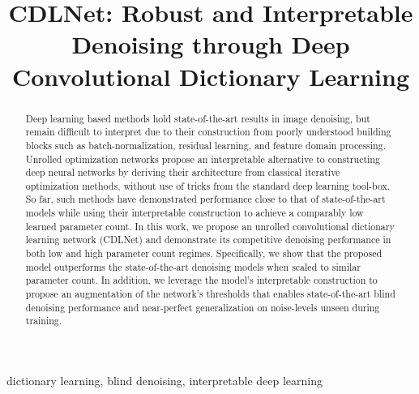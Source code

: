\documentclass[conference]{IEEEtran}
\newcommand{\soa}{state-of-the-art }
\begin{document}
\title{CDLNet: Robust and Interpretable Denoising through Deep Convolutional Dictionary Learning}

\author{
}

\maketitle
\begin{abstract}
Deep learning based methods hold \soa results in image denoising, but remain difficult to interpret due to their construction from poorly understood building blocks such as batch-normalization, residual learning, and feature domain processing. Unrolled optimization networks propose an interpretable alternative to constructing deep neural networks by deriving their architecture from classical iterative optimization methods, without use of tricks from the standard deep learning tool-box. So far, such methods have demonstrated performance close to that of \soa models while using their interpretable construction to achieve a comparably low learned parameter count. In this work, we propose an unrolled convolutional dictionary learning network (CDLNet) and demonstrate its competitive denoising performance in both low and high parameter count regimes. Specifically, we show that the proposed model outperforms the \soa denoising models when scaled to similar parameter count. In addition, we leverage the model's interpretable construction to propose an augmentation of the network's thresholds that enables \soa blind denoising performance and near-perfect generalization on noise-levels unseen during training.
\end{abstract}

\begin{IEEEkeywords}
dictionary learning, blind denoising, interpretable deep learning
\end{IEEEkeywords}
\end{document}
